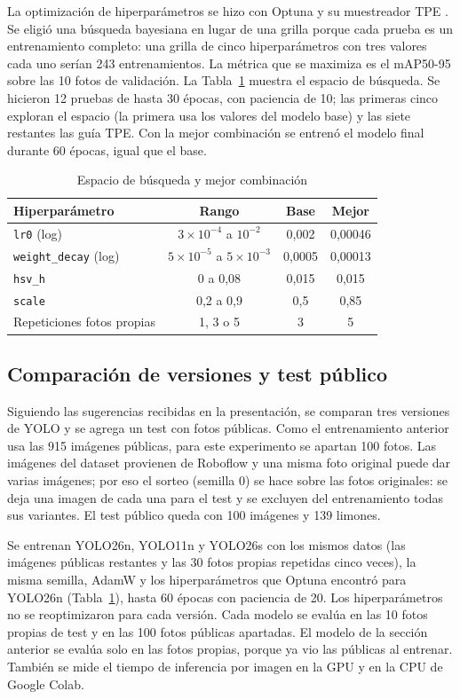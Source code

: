 \documentclass[conference]{IEEEtran}
\begin{document}
La optimización de hiperparámetros se hizo con Optuna \cite{akiba2019} y su muestreador TPE \cite{bergstra2011}. Se eligió una búsqueda bayesiana en lugar de una grilla porque cada prueba es un entrenamiento completo: una grilla de cinco hiperparámetros con tres valores cada uno serían 243 entrenamientos. La métrica que se maximiza es el mAP50-95 sobre las 10 fotos de validación. La Tabla~\ref{tab:espacio} muestra el espacio de búsqueda. Se hicieron 12 pruebas de hasta 30 épocas, con paciencia de 10; las primeras cinco exploran el espacio (la primera usa los valores del modelo base) y las siete restantes las guía TPE. Con la mejor combinación se entrenó el modelo final durante 60 épocas, igual que el base.

\begin{table}[t]
\caption{Espacio de búsqueda y mejor combinación}
\label{tab:espacio}
\centering
\footnotesize
\setlength{\tabcolsep}{3pt}
\begin{tabular}{lccc}
\toprule
\textbf{Hiperparámetro} & \textbf{Rango} & \textbf{Base} & \textbf{Mejor} \\
\midrule
\texttt{lr0} (log) & $3\times10^{-4}$ a $10^{-2}$ & 0,002 & 0,00046 \\
\texttt{weight\_decay} (log) & $5\times10^{-5}$ a $5\times10^{-3}$ & 0,0005 & 0,00013 \\
\texttt{hsv\_h} & 0 a 0,08 & 0,015 & 0,015 \\
\texttt{scale} & 0,2 a 0,9 & 0,5 & 0,85 \\
Repeticiones fotos propias & 1, 3 o 5 & 3 & 5 \\
\bottomrule
\end{tabular}
\end{table}

\subsection{Comparación de versiones y test público}
Siguiendo las sugerencias recibidas en la presentación, se comparan tres versiones de YOLO y se agrega un test con fotos públicas. Como el entrenamiento anterior usa las 915 imágenes públicas, para este experimento se apartan 100 fotos. Las imágenes del dataset provienen de Roboflow y una misma foto original puede dar varias imágenes; por eso el sorteo (semilla 0) se hace sobre las fotos originales: se deja una imagen de cada una para el test y se excluyen del entrenamiento todas sus variantes. El test público queda con 100 imágenes y 139 limones.

Se entrenan YOLO26n, YOLO11n \cite{yolo11} y YOLO26s con los mismos datos (las imágenes públicas restantes y las 30 fotos propias repetidas cinco veces), la misma semilla, AdamW y los hiperparámetros que Optuna encontró para YOLO26n (Tabla~\ref{tab:espacio}), hasta 60 épocas con paciencia de 20. Los hiperparámetros no se reoptimizaron para cada versión. Cada modelo se evalúa en las 10 fotos propias de test y en las 100 fotos públicas apartadas. El modelo de la sección anterior se evalúa solo en las fotos propias, porque ya vio las públicas al entrenar. También se mide el tiempo de inferencia por imagen en la GPU y en la CPU de Google Colab.
\end{document}
